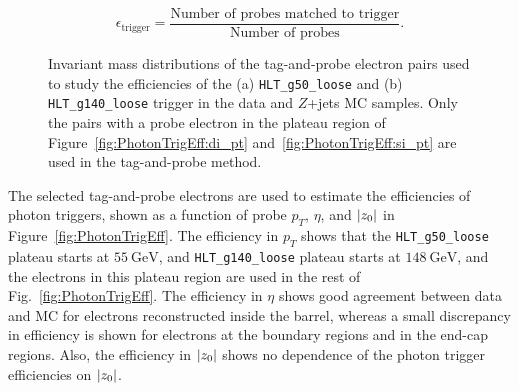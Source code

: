 \begin{equation}
	\label{eq:TrigEff}
    \epsilon_{\mathrm{trigger}} = \frac{\textrm{Number of probes matched to trigger}}{\textrm{Number of probes}}.
\end{equation}
%
\begin{figure}[!htb]
    \centering
    \caption{Invariant mass distributions of the tag-and-probe electron pairs used to study the efficiencies of the (a) \texttt{HLT\_g50\_loose} and (b) \texttt{HLT\_g140\_loose} trigger in the data and $Z$+jets MC samples. Only the pairs with a probe electron in the plateau region of Figure~\ref{fig:PhotonTrigEff:di_pt} and~\ref{fig:PhotonTrigEff:si_pt} are used in the tag-and-probe method.
    }
    \label{fig:PhotonTrigMass}
\end{figure}

The selected tag-and-probe electrons are used to estimate the efficiencies of photon triggers, shown as a function of probe $p_{T}$, $\eta$, and $|z_{0}|$ in Figure~\ref{fig:PhotonTrigEff}. The efficiency in $p_{T}$ shows that the \texttt{HLT\_g50\_loose} plateau starts at $55~\si{\GeV}$, and \texttt{HLT\_g140\_loose} plateau starts at $148~\si{\GeV}$, and the electrons in this plateau region are used in the rest of Fig.~\ref{fig:PhotonTrigEff}. The efficiency in $\eta$ shows good agreement between data and MC for electrons reconstructed inside the barrel, whereas a small discrepancy in efficiency is shown for electrons at the boundary regions and in the end-cap regions. Also, the efficiency in $|z_{0}|$ shows no dependence of the photon trigger efficiencies on $|z_{0}|$.

